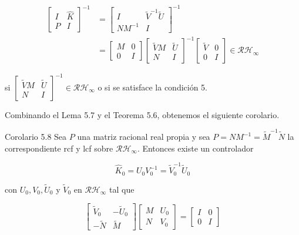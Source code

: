 $$
\begin{aligned}
{\left[\begin{array}{cc}
I & \hat{K} \\
P & I
\end{array}\right]^{-1} } & =\left[\begin{array}{cc}
I & \tilde{V}^{-1} \tilde{U} \\
N M^{-1} & I
\end{array}\right]^{-1} \\
& =\left[\begin{array}{cc}
M & 0 \\
0 & I
\end{array}\right]\left[\begin{array}{cc}
\tilde{V} M & \tilde{U} \\
N & I
\end{array}\right]^{-1}\left[\begin{array}{cc}
\tilde{V} & 0 \\
0 & I
\end{array}\right] \in \mathcal{R} \mathcal{H}_{\infty}
\end{aligned}
$$

si $\left[\begin{array}{cc}\tilde{V} M & \tilde{U} \\ N & I\end{array}\right]^{-1} \in \mathcal{R} \mathcal{H}_{\infty}$ o si se satisface la condición 5.

Combinando el Lema 5.7 y el Teorema 5.6, obtenemos el siguiente corolario.

Corolario 5.8 Sea $P$ una matriz racional real propia y sea $P=N M^{-1}=\tilde{M}^{-1} \tilde{N}$ la correspondiente rcf y lcf sobre $\mathcal{R} \mathcal{H}_{\infty}$. Entonces existe un controlador

$$
\hat{K}_{0}=U_{0} V_{0}^{-1}=\tilde{V}_{0}^{-1} \tilde{U}_{0}
$$

con $U_{0}, V_{0}, \tilde{U}_{0}$ y $\tilde{V}_{0}$ en $\mathcal{R} \mathcal{H}_{\infty}$ tal que

\[
\left[\begin{array}{cc}
\tilde{V}_{0} & -\tilde{U}_{0}  \tag{5.13}\\
-\tilde{N} & \tilde{M}
\end{array}\right]\left[\begin{array}{cc}
M & U_{0} \\
N & V_{0}
\end{array}\right]=\left[\begin{array}{ll}
I & 0 \\
0 & I
\end{array}\right]
\]

